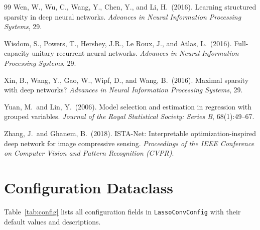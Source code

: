 \documentclass{article}
\begin{document}
{\begin{thebibliography}{99}
Wen, W., Wu, C., Wang, Y., Chen, Y., and Li, H.\ (2016).
Learning structured sparsity in deep neural networks.
{\it Advances in Neural Information Processing Systems}, 29.

Wisdom, S., Powers, T., Hershey, J.R., Le Roux, J., and Atlas, L.\ (2016).
Full-capacity unitary recurrent neural networks.
{\it Advances in Neural Information Processing Systems}, 29.

Xin, B., Wang, Y., Gao, W., Wipf, D., and Wang, B.\ (2016).
Maximal sparsity with deep networks?
{\it Advances in Neural Information Processing Systems}, 29.

Yuan, M.\ and Lin, Y.\ (2006).
Model selection and estimation in regression with grouped variables.
{\it Journal of the Royal Statistical Society: Series B}, 68(1):49--67.

Zhang, J.\ and Ghanem, B.\ (2018).
ISTA-Net: Interpretable optimization-inspired deep network for image compressive sensing.
{\it Proceedings of the IEEE Conference on Computer Vision and Pattern Recognition (CVPR)}.

\end{thebibliography}
}

\appendix
\section{Configuration Dataclass}

Table~\ref{tab:config} lists all configuration fields in \texttt{LassoConvConfig}
with their default values and descriptions.
\end{document}
